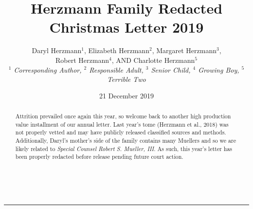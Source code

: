 \documentclass[letterpaper,11pt]{article}
\title{\vspace{-2.0cm}Herzmann Family Redacted Christmas Letter 2019}
\author{Daryl Herzmann${}^1$, Elizabeth Herzmann${}^2$, Margaret 
Herzmann${}^3$,\\
Robert Herzmann${}^4$, AND Charlotte Herzmann${}^5$ \\
\it{${}^1$ Corresponding Author},
\it{${}^2$ Responsible Adult},
\it{${}^3$ Senior Child},
\it{${}^4$ Growing Boy},
\it{${}^5$ Terrible Two}}
\date{21 December 2019}
\newcommand{\Line}[0]{%
  \rule{0cm}{0cm}\\\hrule\rule{0cm}{0cm}%
}
\begin{document}
\maketitle
\vspace{-0.75cm}
\begin{abstract}
Attrition prevailed once again this year, so welcome back to another 
high production value installment
of our annual letter.  Last year's tome (Herzmann et al., 2018) was not properly
vetted and may have publicly released classified sources and methods.
Additionally, Daryl's mother's side of the family contains many Muellers 
and so we are likely related to \textit{Special Counsel Robert S. Mueller, III}.  
As such, this year's letter has been properly redacted before release pending
future court action.
\end{abstract}

\vspace{-0.5cm}
\Line
\end{document}
